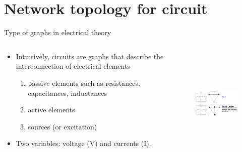\documentclass[xcolor=dvipsnames]{beamer}
\begin{document}
\section{Network topology for circuit}
\begin{frame}{Type of graphs in electrical theory}
\begin{columns}
	\begin{column}{.55\textwidth}
		\begin{itemize}
		\item Intuitively, circuits are graphs that describe the interconnection of electrical elements
			\begin{enumerate}
				\item passive elements such as resistances, capacitances, inductances
				\item active elements
				\item sources (or excitation)
			\end{enumerate}
		\item Two variables: voltage (V) and currents (I).
		\end{itemize}
	\end{column}
	\begin{column}{.75\textwidth}
 		\begin{figure}[!ht]
  			\centering
    		\includegraphics[width=5.5cm,height=5.5cm]{graphs.png}
    	\end{figure}
    \end{column}
\end{columns}
\end{frame}
\end{document}
